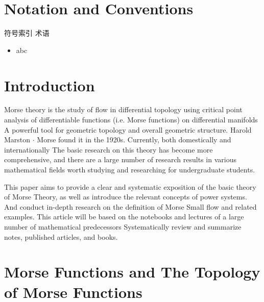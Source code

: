 \documentclass{jnuthesis}
\begin{document}
\tableofcontents

\chapter{Notation and Conventions}
符号索引
术语
\begin{itemize}
  \item abc
\end{itemize}


\chapter{Introduction}
\noindent
Morse theory is the study of flow in differential topology 
using critical point analysis of differentiable functions (i.e. Morse functions) on differential manifolds
A powerful tool for geometric topology and overall geometric structure. 
Harold Marston $\cdot$ Morse found it in the 1920s. 
Currently, both domestically and internationally
The basic research on this theory has become more comprehensive, 
and there are a large number of research results in various mathematical fields worth studying and researching for undergraduate students.

This paper aims to provide a clear and systematic exposition of the basic theory of Morse Theory, 
as well as introduce the relevant concepts of power systems.
And conduct in-depth research on the definition of Morse Small flow and related examples. 
This article will be based on the notebooks and lectures of a large number of mathematical predecessors
Systematically review and summarize notes, published articles, and books.


\chapter{Morse Functions and The Topology of Morse Functions}
\end{document}
